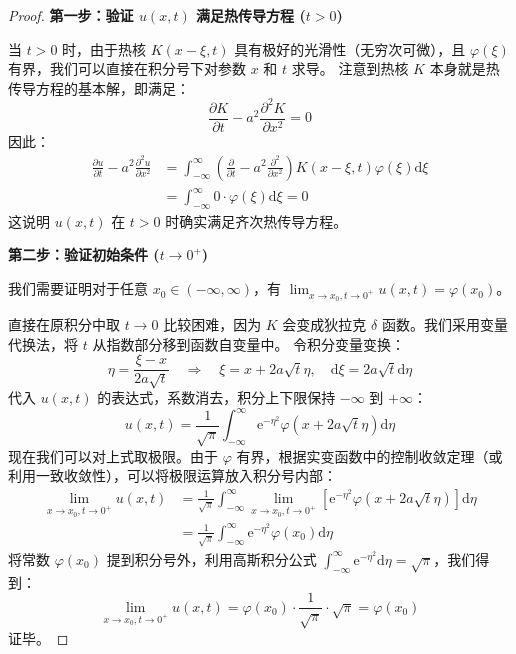 \documentclass[12pt,a4paper]{ctexart}
\begin{document}
	\begin{proof}
		\textbf{第一步：验证 $u(x,t)$ 满足热传导方程 ($t>0$)}
		
		当 $t>0$ 时，由于热核 $K(x-\xi, t)$ 具有极好的光滑性（无穷次可微），且 $\varphi(\xi)$ 有界，我们可以直接在积分号下对参数 $x$ 和 $t$ 求导。
		注意到热核 $K$ 本身就是热传导方程的基本解，即满足：
		\[
		\frac{\partial K}{\partial t} - a^2 \frac{\partial^2 K}{\partial x^2} = 0
		\]
		因此：
		\begin{align*}
			\frac{\partial u}{\partial t} - a^2 \frac{\partial^2 u}{\partial x^2} &= \int_{-\infty}^{\infty} \left( \frac{\partial}{\partial t} - a^2 \frac{\partial^2}{\partial x^2} \right) K(x-\xi, t) \varphi(\xi) \mathrm{d}\xi \\
			&= \int_{-\infty}^{\infty} 0 \cdot \varphi(\xi) \mathrm{d}\xi = 0
		\end{align*}
		这说明 $u(x,t)$ 在 $t>0$ 时确实满足齐次热传导方程。
		
		\vspace{0.5em}
		
		\textbf{第二步：验证初始条件 ($t \to 0^+$)}
		
		我们需要证明对于任意 $x_0 \in (-\infty, \infty)$，有 $\lim_{x \to x_0, t \to 0^+} u(x,t) = \varphi(x_0)$。
		
		直接在原积分中取 $t \to 0$ 比较困难，因为 $K$ 会变成狄拉克 $\delta$ 函数。我们采用变量代换法，将 $t$ 从指数部分移到函数自变量中。
		令积分变量变换：
		\[
		\eta = \frac{\xi - x}{2a\sqrt{t}} \quad \Rightarrow \quad \xi = x + 2a\sqrt{t}\eta, \quad \mathrm{d}\xi = 2a\sqrt{t}\mathrm{d}\eta
		\]
		代入 $u(x,t)$ 的表达式，系数消去，积分上下限保持 $-\infty$ 到 $+\infty$：
		\begin{equation}
			u(x,t) = \frac{1}{\sqrt{\pi}} \int_{-\infty}^{\infty} \mathrm{e}^{-\eta^2} \varphi(x + 2a\sqrt{t}\eta) \mathrm{d}\eta
		\end{equation}
		现在我们可以对上式取极限。由于 $\varphi$ 有界，根据实变函数中的控制收敛定理（或利用一致收敛性），可以将极限运算放入积分号内部：
		\begin{align*}
			\lim_{x \to x_0, t \to 0^+} u(x,t) &= \frac{1}{\sqrt{\pi}} \int_{-\infty}^{\infty} \lim_{x \to x_0, t \to 0^+} \left[ \mathrm{e}^{-\eta^2} \varphi(x + 2a\sqrt{t}\eta) \right] \mathrm{d}\eta \\
			&= \frac{1}{\sqrt{\pi}} \int_{-\infty}^{\infty} \mathrm{e}^{-\eta^2} \varphi(x_0) \mathrm{d}\eta
		\end{align*}
		将常数 $\varphi(x_0)$ 提到积分号外，利用高斯积分公式 $\int_{-\infty}^{\infty} \mathrm{e}^{-\eta^2} \mathrm{d}\eta = \sqrt{\pi}$，我们得到：
		\[
		\lim_{x \to x_0, t \to 0^+} u(x,t) = \varphi(x_0) \cdot \frac{1}{\sqrt{\pi}} \cdot \sqrt{\pi} = \varphi(x_0)
		\]
		证毕。
	\end{proof}
	
\end{document}
